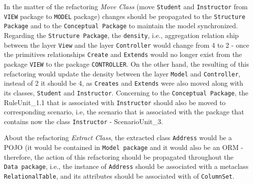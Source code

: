 In the matter of the refactoring \textit{Move Class} (move \texttt{Student} and \texttt{Instructor} from \texttt{VIEW} package to \texttt{MODEL} package) changes should be propagated to the \texttt{Structure Package} and to the \texttt{Conceptual Package} to maintain the model synchronized. Regarding the \texttt{Structure Package}, the \texttt{density}, i.e., aggregation relation ship between the layer \texttt{View} and the layer \texttt{Controller} would change from 4 to 2 - once the primitives relationships \texttt{Create} and \texttt{Extends} would no longer exist from the package \texttt{VIEW} to the package \texttt{CONTROLLER}. On the other hand, the resulting of this refactoring would update the density between the layer \texttt{Model} and \texttt{Controller}, instead of 2 it should be 4, as \texttt{Creates} and \texttt{Extends} were also moved along with its classes, \texttt{Student} and \texttt{Instructor}. Concerning to the \texttt{Conceptual Package}, the  RuleUnit\_1.1 that is associated with \texttt{Instructor} should also be moved to corresponding scenario, i.e, the scenario that is associated with the package that contains now the class \texttt{Instructor} - ScenarioUnit\_3. 

About the refactoring \textit{Extract Class}, the extracted class \texttt{Address} would be a POJO (it would be contained in \texttt{Model package} and it would also be an ORM - therefore, the action of this refactoring should be propagated throughout  the \texttt{Data package}, i.e., the instance of \texttt{Address} should be associated with a metaclass \texttt{RelationalTable}, and its attributes should be associated with  of \texttt{ColumnSet}.



